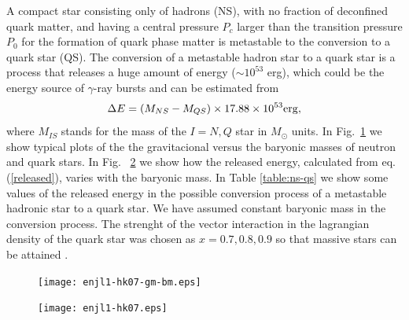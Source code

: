 \documentclass[prc, reprint, amsmath, floatfix,10pt]{revtex4-1}
\begin{document}
A compact star consisting only of hadrons (NS),  with no fraction of 
deconfined quark matter, and having a central pressure $P_c$ larger than the transition
pressure $P_0$ for the formation of quark phase matter is metastable 
\cite{2002NuPhS.113..268B, 2003ApJ...586.1250B, 2004ApJ...614..314B} to the
conversion to a quark star (QS). The conversion of a metastable hadron star to a
quark star is a process that releases a huge amount of energy ($\sim
10^{53}$ erg),  which could be the energy source of $\gamma$-ray bursts
and can be estimated from
\begin{equation}
 \Delta E=\left ( M_{NS}-M_{QS} \right ) \times 17.88 \times 10^{53}
 {\rm erg} ,
\label{released}
\end{equation}
where $M_{IS}$ stands for the mass of the $I=N,Q$ star in $M_\odot$
units. In Fig.~\ref{masses} we show typical plots of the the
gravitacional versus the baryonic masses of neutron and quark stars. 
In Fig. ~\ref{energy} we show how the released energy, calculated from
eq.(\ref{released}), varies with the baryonic mass. 
In Table \ref{table:ns-qs} we show some values of the
released energy in the possible conversion process of a metastable
hadronic star  to a quark star. We have assumed constant baryonic mass
in the conversion process. The strenght of the vector interaction in
the lagrangian density of the quark star was chosen as $x=0.7,0.8, 0.9$
so that massive stars can be attained \cite{njlv}.



\begin{figure}
	\texttt{[image: enjl1-hk07-gm-bm.eps]}
	\caption{\label{masses}}
\end{figure}


\begin{figure}
	\texttt{[image: enjl1-hk07.eps]}
	\caption{\label{energy}}
\end{figure}
\end{document}
